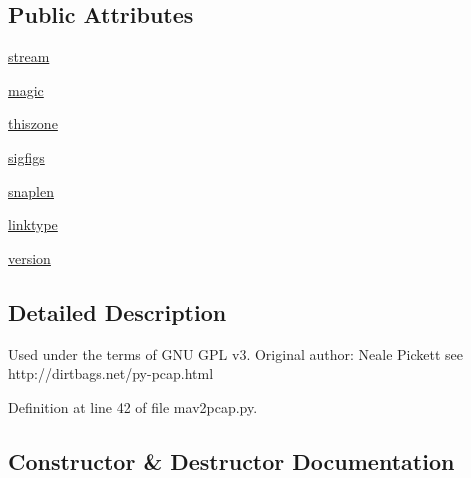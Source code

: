 \subsection*{Public Attributes}
\begin{DoxyCompactItemize}
\item 
\mbox{\hyperlink{classpymavlink_1_1examples_1_1mav2pcap_1_1pcap_a6eb6661b277c5925d2338f6eabd16c69}{stream}}
\item 
\mbox{\hyperlink{classpymavlink_1_1examples_1_1mav2pcap_1_1pcap_a0e063a10152425afec9ca9cc25fb2785}{magic}}
\item 
\mbox{\hyperlink{classpymavlink_1_1examples_1_1mav2pcap_1_1pcap_a1c395139e6a08d237ca71d108b25488a}{thiszone}}
\item 
\mbox{\hyperlink{classpymavlink_1_1examples_1_1mav2pcap_1_1pcap_a7ab6d299412e722819cbcdd6c8558762}{sigfigs}}
\item 
\mbox{\hyperlink{classpymavlink_1_1examples_1_1mav2pcap_1_1pcap_a38d6c237bd315b0cd4abf138aaf262e1}{snaplen}}
\item 
\mbox{\hyperlink{classpymavlink_1_1examples_1_1mav2pcap_1_1pcap_a813b36d754099808dced606c51cbf037}{linktype}}
\item 
\mbox{\hyperlink{classpymavlink_1_1examples_1_1mav2pcap_1_1pcap_a43f4774ba84bc5f07169f86764a53e0e}{version}}
\end{DoxyCompactItemize}


\subsection{Detailed Description}
\begin{DoxyVerb}   Used under the terms of GNU GPL v3.
   Original author: Neale Pickett
   see http://dirtbags.net/py-pcap.html
\end{DoxyVerb}
 

Definition at line 42 of file mav2pcap.\+py.



\subsection{Constructor \& Destructor Documentation}
\mbox{\label{classpymavlink_1_1examples_1_1mav2pcap_1_1pcap_af7029693ff63df6bbbc019cf023fc287}} 
